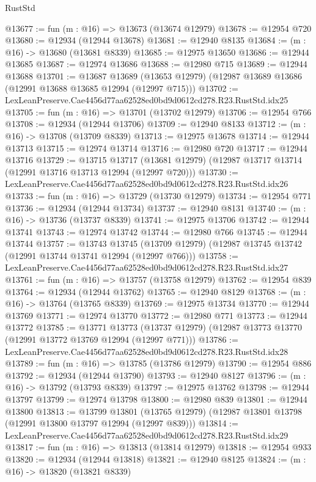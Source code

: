\begin{lexlean}{RustStd}
\begin{coremodule}
@13677 := fun (m : @16) => @13673 (@13674 @12979)
@13678 := @12954 @720
@13680 := @12934 (@12944 @13678)
@13681 := @12940 @8135
@13684 := (m : @16) -> @13680 (@13681 @8339)
@13685 := @12975 @13650
@13686 := @12944 @13685
@13687 := @12974 @13686
@13688 := @12980 @715
@13689 := @12944 @13688
@13701 := @13687
    @13689
    (@13653 @12979)
    (@12987 @13689 @13686 (@12991 @13688 @13685 @12994 (@12997 @715)))
@13702 := LexLeanPreserve.Cae4456d77aa62528ed0bd9d0612cd278.R23.RustStd.idx25
@13705 := fun (m : @16) => @13701 (@13702 @12979)
@13706 := @12954 @766
@13708 := @12934 (@12944 @13706)
@13709 := @12940 @8133
@13712 := (m : @16) -> @13708 (@13709 @8339)
@13713 := @12975 @13678
@13714 := @12944 @13713
@13715 := @12974 @13714
@13716 := @12980 @720
@13717 := @12944 @13716
@13729 := @13715
    @13717
    (@13681 @12979)
    (@12987 @13717 @13714 (@12991 @13716 @13713 @12994 (@12997 @720)))
@13730 := LexLeanPreserve.Cae4456d77aa62528ed0bd9d0612cd278.R23.RustStd.idx26
@13733 := fun (m : @16) => @13729 (@13730 @12979)
@13734 := @12954 @771
@13736 := @12934 (@12944 @13734)
@13737 := @12940 @8131
@13740 := (m : @16) -> @13736 (@13737 @8339)
@13741 := @12975 @13706
@13742 := @12944 @13741
@13743 := @12974 @13742
@13744 := @12980 @766
@13745 := @12944 @13744
@13757 := @13743
    @13745
    (@13709 @12979)
    (@12987 @13745 @13742 (@12991 @13744 @13741 @12994 (@12997 @766)))
@13758 := LexLeanPreserve.Cae4456d77aa62528ed0bd9d0612cd278.R23.RustStd.idx27
@13761 := fun (m : @16) => @13757 (@13758 @12979)
@13762 := @12954 @839
@13764 := @12934 (@12944 @13762)
@13765 := @12940 @8129
@13768 := (m : @16) -> @13764 (@13765 @8339)
@13769 := @12975 @13734
@13770 := @12944 @13769
@13771 := @12974 @13770
@13772 := @12980 @771
@13773 := @12944 @13772
@13785 := @13771
    @13773
    (@13737 @12979)
    (@12987 @13773 @13770 (@12991 @13772 @13769 @12994 (@12997 @771)))
@13786 := LexLeanPreserve.Cae4456d77aa62528ed0bd9d0612cd278.R23.RustStd.idx28
@13789 := fun (m : @16) => @13785 (@13786 @12979)
@13790 := @12954 @886
@13792 := @12934 (@12944 @13790)
@13793 := @12940 @8127
@13796 := (m : @16) -> @13792 (@13793 @8339)
@13797 := @12975 @13762
@13798 := @12944 @13797
@13799 := @12974 @13798
@13800 := @12980 @839
@13801 := @12944 @13800
@13813 := @13799
    @13801
    (@13765 @12979)
    (@12987 @13801 @13798 (@12991 @13800 @13797 @12994 (@12997 @839)))
@13814 := LexLeanPreserve.Cae4456d77aa62528ed0bd9d0612cd278.R23.RustStd.idx29
@13817 := fun (m : @16) => @13813 (@13814 @12979)
@13818 := @12954 @933
@13820 := @12934 (@12944 @13818)
@13821 := @12940 @8125
@13824 := (m : @16) -> @13820 (@13821 @8339)

\end{coremodule}
\end{lexlean}
